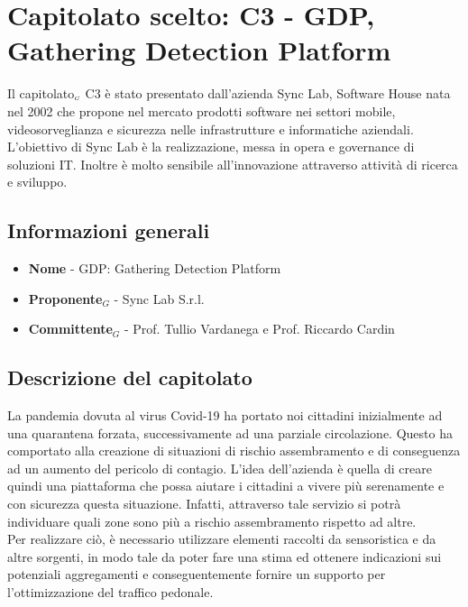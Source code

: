 \chapter{Capitolato scelto: C3 - GDP, Gathering Detection Platform} \label{CapitolatoC3}

Il capitolato$_{\scaleto{G}{3pt}}$ C3 è stato presentato dall'azienda Sync Lab, Software House  nata nel 2002 che propone nel mercato prodotti software nei settori mobile, videosorveglianza e sicurezza nelle infrastrutture e informatiche aziendali. L’obiettivo di Sync Lab è la realizzazione, messa in opera e governance di soluzioni IT. Inoltre è molto sensibile all'innovazione attraverso attività di ricerca  e sviluppo.

\section{Informazioni generali} \label{C3InformazioniGenerali}
\begin{itemize}
	\item \textbf{Nome} - GDP: Gathering Detection Platform
	\item \textbf{Proponente}$_G$ - Sync Lab S.r.l.
	\item \textbf{Committente}$_G$ - Prof. Tullio Vardanega e Prof. Riccardo Cardin
\end{itemize}
\section{Descrizione del capitolato} \label{C3DescrizioneDelCapitolato}
La pandemia dovuta al  virus Covid-19 ha portato noi cittadini inizialmente ad una quarantena forzata, successivamente ad una parziale circolazione. Questo ha comportato alla creazione di situazioni di rischio assembramento e di conseguenza ad un aumento del  pericolo di contagio. L'idea dell'azienda è quella di creare quindi una piattaforma che possa aiutare i cittadini a vivere più serenamente e con sicurezza questa situazione. Infatti, attraverso tale servizio si potrà individuare quali zone sono più a rischio assembramento rispetto ad altre. \\
Per realizzare ciò, è necessario utilizzare elementi raccolti da sensoristica e da altre sorgenti, in modo tale da poter fare una stima ed ottenere indicazioni sui potenziali aggregamenti e conseguentemente fornire un supporto per l'ottimizzazione del traffico pedonale.

